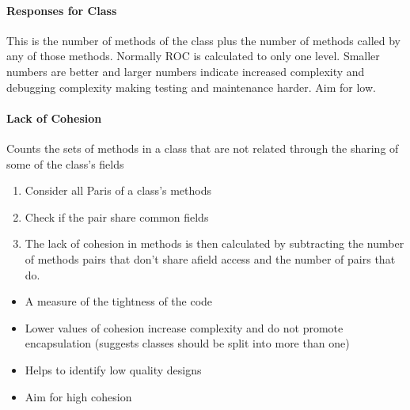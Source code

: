 \paragraph{Responses for Class}\label{par:responses_for_class}

This is the number of methods of the class plus the number of methods called by any of those methods.
Normally ROC is calculated to only one level.
Smaller numbers are better and larger numbers indicate increased complexity and debugging complexity making testing and maintenance harder.
Aim for low.

\paragraph{Lack of Cohesion}\label{par:lack_of_cohesion}

Counts the sets of methods in a class that are not related through the sharing of some of the class's fields
\begin{enumerate}
    \item Consider all Paris of a class's methods
    \item Check if the pair share common fields
    \item The lack of cohesion in methods is then calculated by subtracting the number of methods pairs that don't share afield access and the number of pairs that do.
\end{enumerate}

\begin{itemize}
    \item A measure of the tightness of the code
    \item Lower values of cohesion increase complexity and do not promote encapsulation (suggests classes should be split into more than one)
    \item Helps to identify low quality designs
    \item Aim for high cohesion
\end{itemize}

